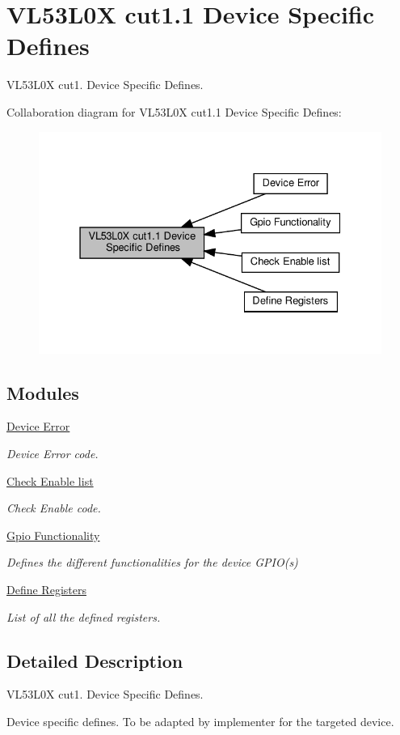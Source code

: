 \hypertarget{group__VL53L0X__DevSpecDefines__group}{}\section{V\+L53\+L0X cut1.1 Device Specific Defines}
\label{group__VL53L0X__DevSpecDefines__group}


V\+L53\+L0X cut1. Device Specific Defines.  


Collaboration diagram for V\+L53\+L0X cut1.1 Device Specific Defines\+:\nopagebreak
\begin{figure}[H]
\begin{center}
\leavevmode
\includegraphics[width=331pt]{group__VL53L0X__DevSpecDefines__group}
\end{center}
\end{figure}
\subsection*{Modules}
\begin{DoxyCompactItemize}
\item 
\hyperlink{group__VL53L0X__DeviceError__group}{Device Error}
\begin{DoxyCompactList}\small\item\em Device Error code. \end{DoxyCompactList}\item 
\hyperlink{group__VL53L0X__CheckEnable__group}{Check Enable list}
\begin{DoxyCompactList}\small\item\em Check Enable code. \end{DoxyCompactList}\item 
\hyperlink{group__VL53L0X__GpioFunctionality__group}{Gpio Functionality}
\begin{DoxyCompactList}\small\item\em Defines the different functionalities for the device G\+P\+I\+O(s) \end{DoxyCompactList}\item 
\hyperlink{group__VL53L0X__DefineRegisters__group}{Define Registers}
\begin{DoxyCompactList}\small\item\em List of all the defined registers. \end{DoxyCompactList}\end{DoxyCompactItemize}


\subsection{Detailed Description}
V\+L53\+L0X cut1. Device Specific Defines. 

Device specific defines. To be adapted by implementer for the targeted device. 